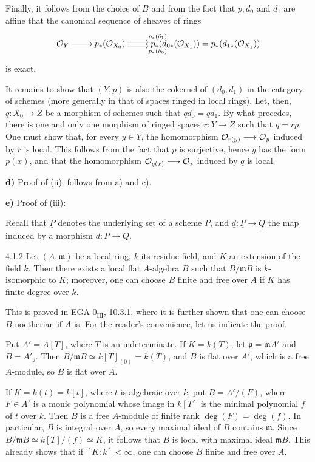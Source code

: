 Finally, it follows from the choice of $B$ and from the fact that $p,d_0$ and $d_1$ are affine that the canonical sequence of sheaves of rings
\[
\xymatrix{\OO_Y\ar[r]&p_*(\OO_{X_0})\ar@<.5ex>[r]^{p_*(\delta_1)}\ar@<-.5ex>[r]_{p_*(\delta_0)}&p_*(d_{0*}(\OO_{X_1}))=p_*(d_{1*}(\OO_{X_1}))}
\]
is exact.

It remains to show that $(Y,p)$ is also the cokernel of $(d_0,d_1)$ in the category of schemes (more generally in that of spaces ringed in local rings). Let, then, $q:X_0\to Z$ be a morphism of schemes such that $qd_0=qd_1$. By what precedes, there is one and only one morphism of ringed spaces $r:Y\to Z$ such that $q=rp$. One must show that, for every $y\in Y$, the homomorphism $\mathcal{O}_{r(y)}\longrightarrow\mathcal{O}_y$ induced by $r$ is local. This follows from the fact that $p$ is surjective, hence $y$ has the form $p(x)$, and that the homomorphism $\mathcal{O}_{q(x)}\longrightarrow\mathcal{O}_x$ induced by $q$ is local.

\textbf{d)} Proof of (ii): follows from a) and c).

\textbf{e)} Proof of (iii):

Recall that $\underline P$ denotes the underlying set of a scheme $P$, and $\underline d:\underline P\to\underline Q$ the map induced by a morphism $d:P\to Q$.
\begin{lemma}{4.1.2}\label{V.4.1.2}
Let $(A,\mathfrak m)$ be a local ring, $k$ its residue field, and $K$ an extension of the field $k$. Then there exists a local flat $A$-algebra $B$ such that $B/\mathfrak mB$ is $k$-isomorphic to $K$; moreover, one can choose $B$ finite and free over $A$ if $K$ has finite degree over $k$.
\end{lemma}
This is proved in EGA $0_{\mathrm{III}}$, 10.3.1, where it is further shown that one can choose $B$ noetherian if $A$ is. For the reader's convenience, let us indicate the proof.

Put $A'=A[T]$, where $T$ is an indeterminate. If $K=k(T)$, let $\mathfrak p=\mathfrak mA'$ and $B=A'_{\mathfrak p}$. Then $B/\mathfrak mB\simeq k[T]_{(0)}=k(T)$, and $B$ is flat over $A'$, which is a free $A$-module, so $B$ is flat over $A$.

If $K=k(t)=k[t]$, where $t$ is algebraic over $k$, put $B=A'/(F)$, where $F\in A'$ is a monic polynomial whose image in $k[T]$ is the minimal polynomial $f$ of $t$ over $k$. Then $B$ is a free $A$-module of finite rank $\deg(F)=\deg(f)$. In particular, $B$ is integral over $A$, so every maximal ideal of $B$ contains $\mathfrak m$. Since $B/\mathfrak mB\simeq k[T]/(f)\simeq K$, it follows that $B$ is local with maximal ideal $\mathfrak mB$. This already shows that if $[K:k]<\infty$, one can choose $B$ finite and free over $A$.

